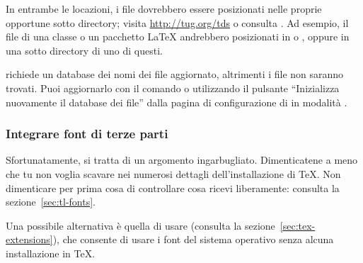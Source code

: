 \documentclass{article}
\begin{document}
In entrambe le locazioni, i file dovrebbero essere posizionati nelle
proprie opportune sotto directory; visita \url{http://tug.org/tds} o
consulta . Ad esempio, il file di una
classe o un pacchetto \LaTeX{} andrebbero posizionati in
 o , oppure in
una sotto directory di uno di questi.

 richiede un database dei nomi dei file aggiornato,
altrimenti i file non saranno trovati. Puoi aggiornarlo con il comando
 o utilizzando il pulsante ``Inizializza nuovamente il
database dei file'' dalla pagina di configurazione di  in
modalità \GUI.

\subsubsection{Integrare font di terze parti}

Sfortunatamente, si tratta di un argomento ingarbugliato. Dimenticatene a
meno che tu non voglia scavare nei numerosi dettagli dell'installazione di
\TeX{}. Non dimenticare per prima cosa di controllare cosa ricevi
liberamente: consulta la sezione~\ref{sec:tl-fonts}.

Una possibile alternativa è quella di usare \XeTeX (consulta la
sezione~\ref{sec:tex-extensions}), che consente di usare i font del
sistema operativo senza alcuna installazione in \TeX.
\end{document}
